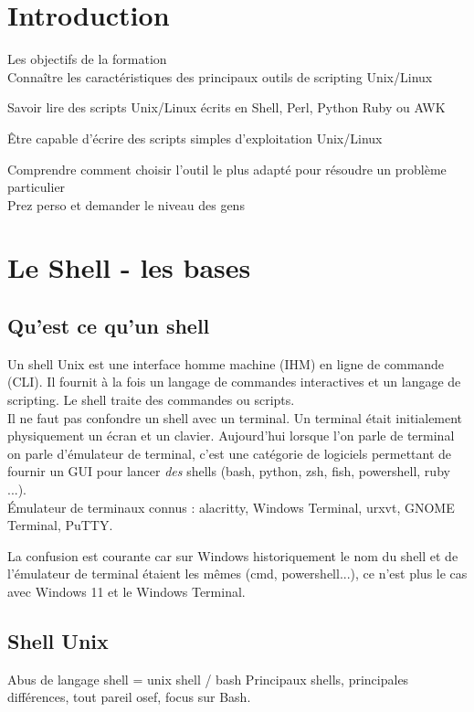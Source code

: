 \documentclass[11pt,a4paper]{article}
\begin{document}

\section{Introduction}

Les objectifs de la formation\\ 

Connaître les caractéristiques des principaux outils de scripting Unix/Linux

Savoir lire des scripts Unix/Linux écrits en Shell, Perl, Python Ruby ou AWK

Être capable d'écrire des scripts simples d'exploitation Unix/Linux

Comprendre comment choisir l'outil le plus adapté pour résoudre un problème particulier
\\

Prez perso et demander le niveau des gens

\section{Le Shell - les bases}

\subsection{Qu'est ce qu'un shell}

Un shell Unix est une interface homme machine (IHM) en ligne de commande (CLI). Il fournit à la fois un langage de commandes interactives et un langage de scripting. Le shell traite des commandes ou scripts.\\ 
Il ne faut pas confondre un shell avec un terminal. Un terminal était initialement physiquement un écran et un clavier. Aujourd'hui lorsque l'on parle de terminal on parle d'émulateur de terminal, c'est une catégorie de logiciels permettant de fournir un GUI pour lancer \textit{des} shells (bash, python, zsh, fish, powershell, ruby ...). \\ 
\'Emulateur de terminaux connus : alacritty, Windows Terminal, urxvt, GNOME Terminal, PuTTY.

La confusion est courante car sur Windows historiquement le nom du shell et de l'émulateur de terminal étaient les mêmes (cmd, powershell...), ce n'est plus le cas avec Windows 11 et le Windows Terminal.\\


\subsection{Shell Unix}
Abus de langage shell = unix shell / bash
Principaux shells, principales différences, tout pareil osef, focus sur Bash.
\end{document}
